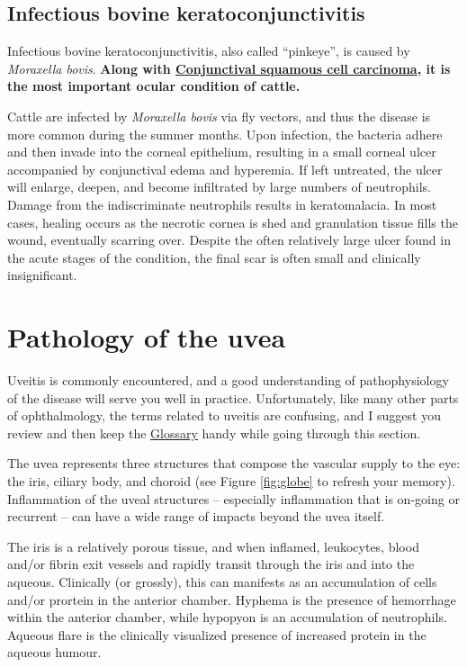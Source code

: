 \documentclass[openany]{book}
\begin{document}
\hypertarget{infectious-bovine-keratoconjunctivitis}{\section{Infectious
bovine
keratoconjunctivitis}\label{infectious-bovine-keratoconjunctivitis}}

Infectious bovine keratoconjunctivitis, also called ``pinkeye'', is
caused by \emph{Moraxella bovis}. \textbf{Along with
\protect\hyperlink{conjunctival-squamous-cell-carcinoma}{Conjunctival
squamous cell carcinoma}, it is the most important ocular condition of
cattle.}

Cattle are infected by \emph{Moraxella bovis} via fly vectors, and thus
the disease is more common during the summer months. Upon infection, the
bacteria adhere and then invade into the corneal epithelium, resulting
in a small corneal ulcer accompanied by conjunctival edema and
hyperemia. If left untreated, the ulcer will enlarge, deepen, and become
infiltrated by large numbers of neutrophils. Damage from the
indiscriminate neutrophils results in keratomalacia. In most cases,
healing occurs as the necrotic cornea is shed and granulation tissue
fills the wound, eventually scarring over. Despite the often relatively
large ulcer found in the acute stages of the condition, the final scar
is often small and clinically insignificant.

\chapter{Pathology of the uvea}\label{pathology-of-the-uvea}

Uveitis is commonly encountered, and a good understanding of
pathophysiology of the disease will serve you well in practice.
Unfortunately, like many other parts of ophthalmology, the terms related
to uveitis are confusing, and I suggest you review and then keep the
\protect\hyperlink{glossary}{Glossary} handy while going through this
section.

The uvea represents three structures that compose the vascular supply to
the eye: the iris, ciliary body, and choroid (see Figure \ref{fig:globe}
to refresh your memory). Inflammation of the uveal structures --
especially inflammation that is on-going or recurrent -- can have a wide
range of impacts beyond the uvea itself.

The iris is a relatively porous tissue, and when inflamed, leukocytes,
blood and/or fibrin exit vessels and rapidly transit through the iris
and into the aqueous. Clinically (or grossly), this can manifests as an
accumulation of cells and/or prortein in the anterior chamber. Hyphema
is the presence of hemorrhage within the anterior chamber, while
hypopyon is an accumulation of neutrophils. Aqueous flare is the
clinically visualized presence of increased protein in the aqueous
humour.
\end{document}
